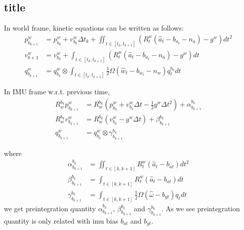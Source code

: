 \subsection{title}
In world frame, kinetic equations can be written as follows:
\begin{equation}
	\begin{split}
		p_{b_{k+1}}^w & = p_{b_k}^w + v_{b_k}^w \Delta t_k +\iint_{t\in [t_k,t_{k+1}]} (R^w_t(\hat{a}_t-b_{a_t}-n_a)-g^w) dt^2 \\
		v_{b+1}^w & = v_{b_k}^w + \int_{t\in [t_k,t_{k+1}]} (R^w_t(\hat{a}_t-b_{a_t}-n_a)-g^w) dt \\
		q_{b_{k+1}}^w & = q_{b_k}^w \otimes \int_{t\in [t_k,t_{k+1}]} \frac{1}{2} \Omega(\hat{w}_t-b_{w_t}-n_w)q_t^{b_k} dt
	\end{split}
\end{equation}
\par In IMU frame w.r.t. previous time,
\begin{equation}
	\begin{split}
		R_w^{b_k}p_{b_{k+1}}^w &= R_w^{b_k}( p_{b_k}^w + v_{b_k}^w\Delta{t} - \frac12g^w\Delta{t}^2) + \alpha_{b_{k+1}}^{b_k} \\
		R_w^{b_k}v_{b_{k+1}}^w &= R_w^{b_k}( v_{b_k}^w - g^w\Delta{t} ) + \beta_{b_{k+1}}^{b_k} \\
		q_{b_{k+1}}^w &= q_{b_k}^w \otimes \gamma_{b_{k+1}}^{b_k}
	\end{split}
\end{equation}
\par where
\begin{equation}
	\begin{split}
		\alpha_{b_{k+1}}^{b_k} &= \iint_{t\in[k,k+1]}R_t^w(\hat{a}_t-b_{at})dt^2 \\
		\beta_{b_{k+1}}^{b_k} &= \int_{t\in[k,k+1]}R_t^w(\hat{a}_t-b_{at})dt \\
		\gamma_{b_{k+1}}^{b_k} &= \int_{t\in[k,k+1]}\frac12\Omega(\hat{\omega}-b_{gt})q_tdt
	\end{split}
\end{equation}
we get preintegration quantity $\alpha_{b_{k+1}}^{b_k}$, $\beta_{b_{k+1}}^{b_k}$ and $\gamma_{b_{k+1}}^{b_k}$. As we see preintegration quantity is only related with imu bias $b_{at}$ and $b_{gt}$.




